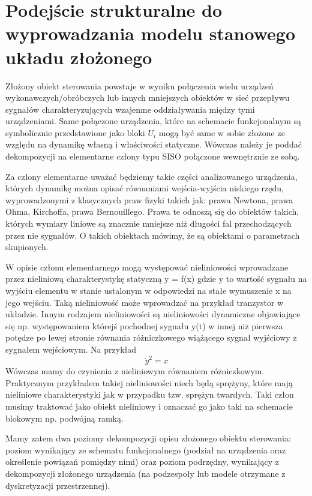 \documentclass{article}
\begin{document}
	\section{Podejście strukturalne do wyprowadzania modelu stanowego układu złożonego}

		Złożony obiekt sterowania powstaje w wyniku połączenia wielu urządzeń wykonawczych/obróbczych lub
		innych mniejszych obiektów  w sieć przepływu sygnałów charakteryzujących wzajemne
		oddziaływania między tymi urządzeniami.
		Same połączone urządzenia, które na schemacie funkcjonalnym są
		symbolicznie przedstawione jako bloki $U_i$ mogą być same w sobie złożone ze względu na
		dynamikę własną i właściwości statyczne. Wówczas należy je poddać dekompozycji na
		elementarne człony typu SISO połączone wewnętrznie ze sobą.
		
		Za człony elementarne uważać będziemy takie części analizowanego urządzenia, których
		dynamikę można opisać równaniami wejścia-wyjścia niskiego rzędu,
		wyprowadzonymi z klasycznych praw fizyki takich jak: prawa Newtona, prawa Ohma,
		Kirchoffa, prawa Bernouillego. Prawa te odnoszą się do obiektów
		takich, których wymiary liniowe są znacznie mniejsze niż długości fal
		przechodzących przez nie sygnałów. O takich obiektach mówimy, że są obiektami
		o parametrach skupionych.

		W opisie członu elementarnego mogą występować nieliniowości wprowadzane przez
		nieliniową charakterystykę statyczną y = f(x) gdzie y to wartość sygnału na
		wyjściu elementu w stanie ustalonym w odpowiedzi na stałe wymuszenie
		x na jego wejściu.
		Taką nieliniowość może wprowadzać na przykład tranzystor w układzie.
		Innym rodzajem nieliniowości są nieliniowości dynamiczne objawiające się np. występowaniem
		którejś pochodnej sygnału y(t) w innej niż pierwsza potędze po lewej stronie równania
		różniczkowego wiążącego sygnał wyjściowy z sygnałem wejściowym.
		Na przykład
		\begin{equation}
			\dot{y}^2 = x 
		\end{equation}
		Wówczas mamy do
		czynienia z nieliniowym równaniem różniczkowym.
		Praktycznym przykładem takiej nieliniowości niech będą
		sprężyny, które mają nieliniowe charakterystyki jak w przypadku tzw. sprężyn twardych.
		Taki człon musimy traktować jako
		obiekt nieliniowy i oznaczać go jako taki na schemacie blokowym np. podwójną ramką.

		Mamy zatem dwa poziomy dekompozycji opisu złożonego obiektu sterowania: poziom
		wynikający ze schematu funkcjonalnego (podział na urządzenia oraz określenie powiązań
		pomiędzy nimi) oraz poziom podrzędny, wynikający z dekompozycji złożonego urządzenia (na
		podzespoły lub modele otrzymane z dyskretyzacji przestrzennej).
\end{document}
